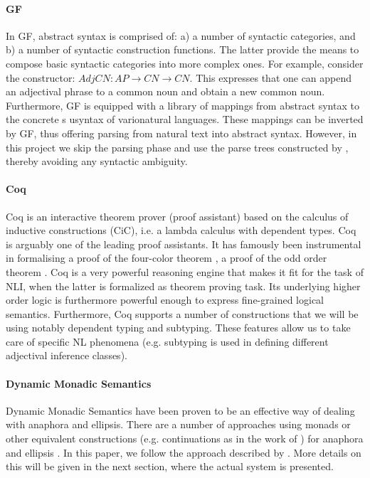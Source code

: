 \documentclass[11pt]{article}
\begin{document}
\paragraph{GF}
In GF, abstract syntax is comprised of: a) a number of syntactic
categories, and b) a number of syntactic construction functions. The latter
provide the means to compose basic syntactic categories into more complex
ones.  For example, consider the constructor: $AdjCN : AP → CN → CN$. This  expresses
that one can append an adjectival phrase to a common noun and obtain
a new common noun. Furthermore,  GF is equipped  with a library of mappings from abstract
syntax to the concrete s usyntax of varionatural languages. These mappings can be inverted by GF, thus offering
parsing from natural text into abstract syntax. However, in this project we skip the
parsing phase and use the parse trees constructed by \citet{Ljunglof:2012},
thereby avoiding any syntactic ambiguity. 

\paragraph{Coq}
Coq is an interactive theorem prover (proof assistant) based on the
calculus of inductive constructions (CiC), i.e.  a lambda calculus
with dependent types. Coq is arguably one of the leading proof
assistants. It has famously been instrumental in formalising a proof
of the four-color theorem \citep{Gonthier:2008}, a proof of the odd
order theorem \citep{Gonthier:2013}. Coq is a very powerful
reasoning engine that makes it fit for the task of NLI, when the
latter is formalized as theorem proving task. Its underlying higher
order logic is furthermore powerful enough to express fine-grained
logical semantics. Furthermore, Coq supports a number of constructions
that we will be using notably dependent typing and subtyping. These
features allow us to take care of specific NL phenomena
(e.g. subtyping is used in defining different adjectival inference
classes).

\paragraph{Dynamic Monadic Semantics}
Dynamic Monadic Semantics have been proven to be an effective way of
dealing with anaphora and ellipsis. There are a number of approaches
using monads or other equivalent constructions (e.g. continuations as in the work of
\citet{de2006}) for anaphora and ellipsis
\citet{Shan:2002,unger:2011,Barker:04,de2016,charlow:2017}. In this
paper, we follow the approach described by
\citet{bernardy_jolli}. More details on this will be given in the next
section, where the actual system is presented.
\end{document}
